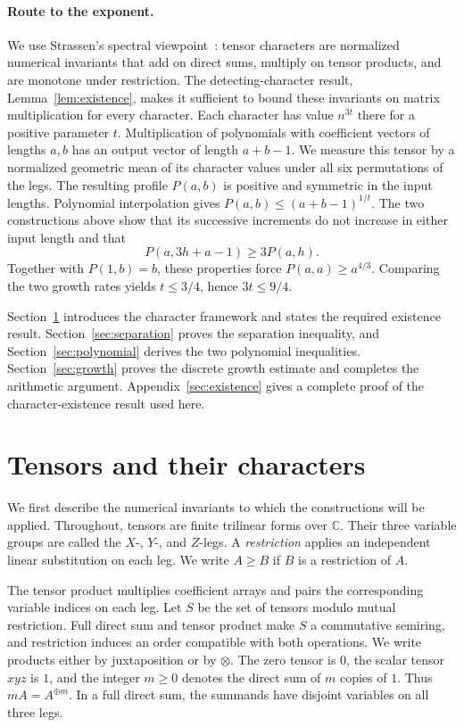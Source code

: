 \documentclass[11pt]{article}
\theoremstyle{definition}
\theoremstyle{remark}
\newcommand{\C}{\mathbb C}
\numberwithin{equation}{section}
\begin{document}
\paragraph{Route to the exponent.}
We use Strassen's spectral viewpoint~\cite{Str88,CVZ}: tensor characters
are normalized numerical invariants that add on direct sums, multiply on
tensor products, and are monotone under restriction. The detecting-character
result, Lemma~\ref{lem:existence}, makes it sufficient to bound these
invariants on matrix multiplication for every character. Each character
has value $n^{3t}$ there for a positive parameter $t$.
Multiplication of polynomials with coefficient vectors of lengths $a,b$
has an output vector of length $a+b-1$. We measure this tensor by a
normalized geometric mean of its character values under all six
permutations of the legs. The resulting profile $P(a,b)$ is positive
and symmetric in the input lengths. Polynomial interpolation gives
$P(a,b)\leq(a+b-1)^{1/t}$. The two constructions above show that its
successive increments do not increase in either input length and that
\[
 P(a,3h+a-1)\geq3P(a,h).
\]
Together with $P(1,b)=b$, these properties force
$P(a,a)\geq a^{4/3}$. Comparing the two growth
rates yields $t\leq3/4$, hence $3t\leq9/4$.

Section~\ref{sec:characters} introduces the character framework and
states the required existence result. Section~\ref{sec:separation}
proves the separation inequality, and Section~\ref{sec:polynomial}
derives the two polynomial inequalities.
Section~\ref{sec:growth} proves the discrete growth estimate and completes
the arithmetic argument. Appendix~\ref{sec:existence} gives a complete
proof of the character-existence result used here.

\section{Tensors and their characters}\label{sec:characters}

We first describe the numerical invariants to which the constructions
will be applied. Throughout, tensors are finite trilinear forms over
$\C$. Their three variable groups are called the $X$-, $Y$-, and
$Z$-legs. A \emph{restriction} applies an independent linear substitution
on each leg. We write $A\geq B$ if $B$ is a restriction of $A$.

The tensor product multiplies coefficient arrays and pairs the
corresponding variable indices on each leg. Let $S$ be the set of tensors
modulo mutual restriction. Full direct sum and tensor product make $S$
a commutative semiring, and restriction
induces an order compatible with both operations. We write products
either by juxtaposition or by $\otimes$. The zero tensor is $0$, the
scalar tensor $xyz$ is $1$, and the integer $m\geq0$ denotes the direct
sum of $m$ copies of $1$. Thus $mA=A^{\oplus m}$. In a full direct sum,
the summands have disjoint variables on all three legs.
\end{document}
